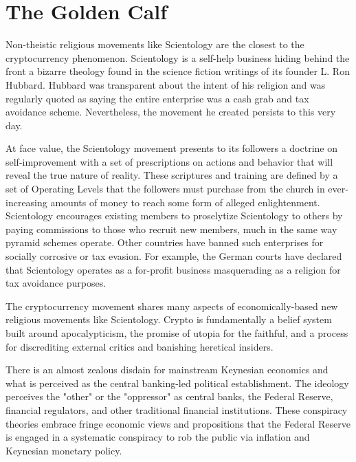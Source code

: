 
\section{The Golden Calf}

Non-theistic religious movements like Scientology are the closest to the
cryptocurrency phenomenon. Scientology is a self-help business hiding behind the
front a bizarre theology found in the science fiction writings of its founder L.
Ron Hubbard. Hubbard was transparent about the intent of his religion and was
regularly quoted as saying the entire enterprise was a cash grab and tax
avoidance scheme. Nevertheless, the movement he created persists to this very
day.

At face value, the Scientology movement presents to its followers a doctrine on
self-improvement with a set of prescriptions on actions and behavior that will
reveal the true nature of reality. These scriptures and training are defined by
a set of Operating Levels that the followers must purchase from the church in
ever-increasing amounts of money to reach some form of alleged enlightenment.
Scientology encourages existing members to proselytize Scientology to others by
paying commissions to those who recruit new members, much in the same way
pyramid schemes operate. Other countries have banned such enterprises for
socially corrosive or tax evasion. For example, the German courts have declared
that Scientology operates as a for-profit business masquerading as a religion
for tax avoidance purposes.


The cryptocurrency movement shares many aspects of economically-based new
religious movements like Scientology. Crypto is fundamentally a belief system
built around apocalypticism, the promise of utopia for the faithful, and a
process for discrediting external critics and banishing heretical insiders.
\cite{@ftCult}

There is an almost zealous disdain for mainstream Keynesian economics and what
is perceived as the central banking-led political establishment. The ideology
perceives the "other" or the "oppressor" as central banks, the Federal Reserve,
financial regulators, and other traditional financial institutions. These
conspiracy theories embrace fringe economic views and propositions that the
Federal Reserve is engaged in a systematic conspiracy to rob the public via
inflation and Keynesian monetary policy.

